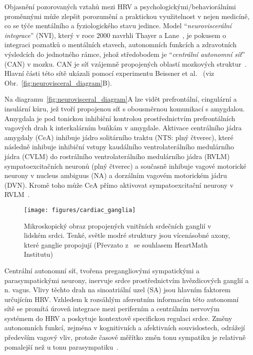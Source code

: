 
Objasnění pozorovaných vztahů mezi \gls{HRV} a psychologickými/behaviorálními
proměnnými může zlepšit porozumění a praktickou využitelnost v nejen medicíně,
co se týče mentálního a fyziologického stavu jedince. Model
\enquote{\emph{neuroviscerální integrace}} (\gls{NVI}), který v roce 2000
navrhli Thayer a Lane~\cite{Thayer_Lane_2000}, je pokusem o integraci poznatků o
mentálních stavech, autonomních funkcích a zdravotních výsledcích do jednotného
rámce, jehož středobodem je \enquote{\emph{centrální autonomní síť}} (\gls{CAN})
v mozku. \gls{CAN} je síť vzájemně propojených oblastí mozkových
struktur~\cite{Thayer_Lane_2009}. Hlavní části této sítě ukázali pomocí
experimentu Beissner et al.~\cite{Beissner2013} (viz
Obr.~\ref{fig:neurovisceral_diagram}B).

Na diagramu~\ref{fig:neurovisceral_diagram}A lze vidět prefrontální, cingulární a
insulární kůru, jež tvoří propojenou síť s obousměrnou komunikací s amygdalou.
Amygdala je pod tonickou inhibiční kontrolou prostřednictvím prefrontálních
vagových drah k interkalárním buňkám v amygdale. Aktivace centrálního jádra
amygdaly (\gls{CeA}) inhibuje jádro solitárního traktu (\gls{NTS}: plný
čtverec), které následně inhibuje inhibiční vstupy kaudálního ventrolaterálního
medulárního jádra (\gls{CVLM}) do rostrálního ventrolaterálního medulárního
jádra (\gls{RVLM}) sympatoexcitačních neuronů (plný čtverec) a současně inhibuje
vagové motorické neurony v nucleus ambiguus (\gls{NA}) a dorzálním vagovém
motorickém jádru (\gls{DVN}). Kromě toho může CeA přímo aktivovat
sympatoexcitační neurony v RVLM~\cite{gianaros2008}.

\begin{figure}[h]
    \begin{center}
        \texttt{[image: figures/cardiac\_ganglia]}
        \caption{Mikroskopický obraz propojených vnitřních srdečních ganglií v
            lidském srdci. Tenké, světle modré struktury jsou vícenásobné axony,
            které ganglie propojují (Převzato z~\cite{Shaffer2014} se
            souhlasem HeartMath Institutu)}
        \label{fig:cardiac_ganglia}
    \end{center}
\end{figure}

Centrální autonomní síť, tvořena pregangliovými sympatickými a parasympatickými
neurony, inervuje srdce prostřednictvím hvězdicových ganglií a n. vagus. Vlivy
těchto drah na sinoatriální uzel (\gls{SA}) jsou hlavním faktorem určujícím
\gls{HRV}. Vzhledem k rozsáhlým aferentním informacím této autonomní sítě se
promítá úroveň integrace mezi periferním a centrálním nervovým systémem do
\gls{HRV} a poskytuje kontextově specifickou regulaci srdce. Změny autonomních
funkcí, zejména v kognitivních a afektivních souvislostech, odrážejí především
vagový vliv, protože časové měřítko změn tonu sympatiku je relativně pomalejší
než u tonu parasympatiku~\cite{Thayer_Lane_2009,Thayer2009}.

